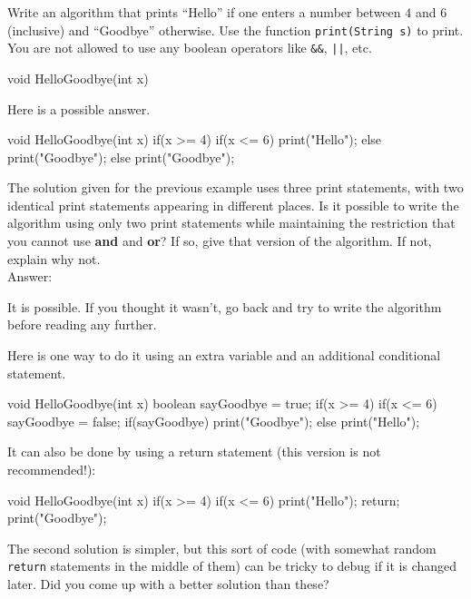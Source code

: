\begin{exer} 
Write an algorithm that prints ``Hello'' if one enters a number between $4$ and $6$ (inclusive) and ``Goodbye'' otherwise. Use the function \verb+print(String s)+ to print.
You are not allowed to use any boolean operators like \verb+&&+, 
\verb+||+, etc.
\begin{code}
    void HelloGoodbye(int x) {
















    }
\end{code}
\begin{answer}
Here is a possible answer.
\begin{code}
    void HelloGoodbye(int x) {
        if(x >= 4) {
            if(x <= 6) {
                print("Hello");
            } else {
                print("Goodbye");
            }
        } else {
            print("Goodbye");
        }
    }
\end{code}
\end{answer}
\end{exer}


\begin{ques}
The solution given for the previous example uses three print statements, with two identical
print statements appearing in different places.  Is it possible to write the algorithm using
only two print statements while maintaining the restriction that you cannot use {\bf and} and {\bf or}?
If so, give that version of the algorithm.  If not, explain why not.\\
Answer:\\
\vspace*{2.5in}
\begin{answer}
It is possible.  If you thought it wasn't, go back and try to write the algorithm before
reading any further.

Here is one way to do it using an extra variable and an additional conditional statement.
\begin{code}
    void HelloGoodbye(int x) {
        boolean sayGoodbye = true;
        if(x >= 4) {
            if(x <= 6) {
                sayGoodbye = false;
            }
        }
        if(sayGoodbye) {
            print("Goodbye");
        } else {
            print("Hello");
        }
    }
\end{code}
It can also be done by using a return statement
(this version is not recommended!):
\begin{code}
    void HelloGoodbye(int x) {
        if(x >= 4) {
            if(x <= 6) {
                print("Hello");
                return;
            }
        }
        print("Goodbye");
    }
\end{code}
The second solution is simpler, 
but this sort of code (with somewhat random \verb+return+ statements in the middle
of them) can be tricky to debug if it is changed later.
Did you come up with a better solution than these?
\end{answer}
\end{ques}

